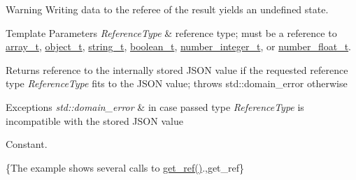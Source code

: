 \begin{DoxyWarning}{Warning}
Writing data to the referee of the result yields an undefined state.
\end{DoxyWarning}

\begin{DoxyTemplParams}{Template Parameters}
{\em Reference\-Type} & reference type; must be a reference to \hyperlink{classnlohmann_1_1basic__json_ab00b882d39306d663c23dab110f5cae0}{array\-\_\-t}, \hyperlink{classnlohmann_1_1basic__json_a0ac9894c9de8dc551cf2e5f1c605537f}{object\-\_\-t}, \hyperlink{classnlohmann_1_1basic__json_ab63e618bbb0371042b1bec17f5891f42}{string\-\_\-t}, \hyperlink{classnlohmann_1_1basic__json_af3bc3e83aa162d7ba4df16a949872723}{boolean\-\_\-t}, \hyperlink{classnlohmann_1_1basic__json_ac4b10b2364f26ce47bdb9a413ff04a59}{number\-\_\-integer\-\_\-t}, or \hyperlink{classnlohmann_1_1basic__json_a74a0013e847fdc574b48f931f0e757e1}{number\-\_\-float\-\_\-t}.\\
\hline
\end{DoxyTemplParams}
\begin{DoxyReturn}{Returns}
reference to the internally stored J\-S\-O\-N value if the requested reference type {\itshape Reference\-Type} fits to the J\-S\-O\-N value; throws std\-::domain\-\_\-error otherwise
\end{DoxyReturn}

\begin{DoxyExceptions}{Exceptions}
{\em std\-::domain\-\_\-error} & in case passed type {\itshape Reference\-Type} is incompatible with the stored J\-S\-O\-N value\\
\hline
\end{DoxyExceptions}
Constant.

\{The example shows several calls to {\ttfamily \hyperlink{classnlohmann_1_1basic__json_a4f332e90f3cae562d0c3fa6ba48f74f9}{get\-\_\-ref()}}.,get\-\_\-ref\}

